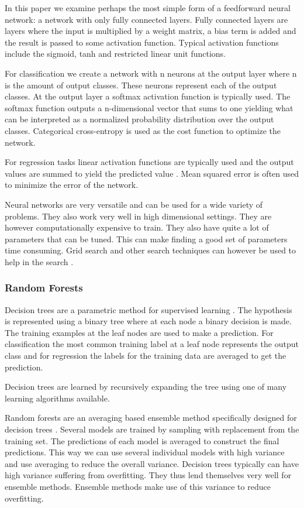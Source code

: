 In this paper we examine perhaps the most simple form of a feedforward neural network: a network with only fully connected layers. Fully connected layers are layers where the input is multiplied by a weight matrix, a bias term is added and the result is passed to some activation function. Typical activation functions include the sigmoid, tanh and restricted linear unit functions.

For classification we create a network with n neurons at the output layer where n is the amount of output classes. These neurons represent each of the output classes. At the output layer a softmax activation function is typically used. The softmax function outputs a n-dimensional vector that sums to one yielding what can be interpreted as a normalized probability distribution over the output classes. Categorical cross-entropy is used as the cost function to optimize the network.

For regression tasks linear activation functions are typically used and the output values are summed to yield the predicted value \cite{deeplearning4j-docs}. Mean squared error is often used to minimize the error of the network.

Neural networks are very versatile and can be used for a wide variety of problems. They also work very well in high dimensional settings. They are however computationally expensive to train. They also have quite a lot of parameters that can be tuned. This can make finding a good set of parameters time consuming. Grid search and other search techniques can however be used to help in the search \cite{deep-learning-book}.

\subsubsection{Random Forests}

Decision trees are a parametric method for supervised learning \cite{alpaydin}. The hypothesis is represented using a binary tree where at each node a binary decision is made. The training examples at the leaf nodes are used to make a prediction. For classification the most common training label at a leaf node represents the output class and for regression the labels for the training data are averaged to get the prediction.

Decision trees are learned by recursively expanding the tree using one of many learning algorithms available.

Random forests are an averaging based ensemble method specifically designed for decision trees \cite{sklearn}. Several models are trained by sampling with replacement from the training set. The predictions of each model is averaged to construct the final predictions. This way we can use several individual models with high variance and use averaging to reduce the overall variance. Decision trees typically can have high variance suffering from overfitting. They thus lend themselves very well for ensemble methods. Ensemble methods make use of this variance to reduce overfitting.


